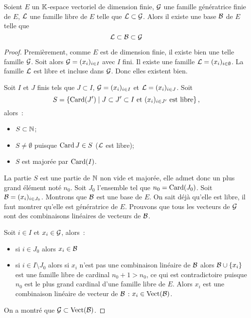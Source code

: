 \begin{theo}
  Soient \(E\) un \(\mathbb{K}\)-espace vectoriel de dimension finie, \(\mathcal{G}\) une famille génératrice finie de \(E\), \(\mathcal{L}\) une famille libre de \(E\) telle que \(\mathcal{L} \subset \mathcal{G}\). Alors il existe une base \(\mathcal{B}\) de \(E\) telle que
  \begin{equation}
    \mathcal{L} \subset \mathcal{B} \subset \mathcal{G}
  \end{equation}
\end{theo}
\begin{proof}
  Premièrement, comme \(E\) est de dimension finie, il existe bien une telle famille \(\mathcal{G}\). Soit alors \(\mathcal{G}=(x_i)_{i \in I}\) avec \(I\) fini. Il existe une famille \(\mathcal{L}=(x_i)_{i \in \emptyset}\). La famille \(\mathcal{L}\) est libre et incluse dans \(\mathcal{G}\). Donc elles existent bien.

  Soit \(I\) et \(J\) finis tels que \(J \subset I\), \(\mathcal{G}=(x_i)_{i \in I}\) et \(\mathcal{L}=(x_i)_{i \in J}\). Soit
  \begin{equation}
    S = \left\{\operatorname{Card}(J')\mathrel{}\middle|\mathrel{}J \subset J' \subset I \text{~et } (x_i)_{i \in J'} \text{~est libre}\right\},
  \end{equation}
  alors~:
  \begin{itemize}
  \item \(S \subset \mathbb{N}\);
  \item \(S \neq \emptyset\) puisque \(\operatorname{Card} J \in S\) (\(\mathcal{L}\) est libre);
  \item \(S\) est majorée par \(\operatorname{Card}(I)\).
  \end{itemize}
  La partie \(S\) est une partie de \(\mathbb{N}\) non vide et majorée, elle admet donc un plus grand élément noté \(n_0\). Soit \(J_0\) l'ensemble tel que \(n_0=\operatorname{Card}(J_0)\). Soit \(\mathcal{B}=(x_i)_{i \in J_0}\). Montrons que \(\mathcal{B}\) est une base de \(E\). On sait déjà qu'elle est libre, il faut montrer qu'elle est génératrice de \(E\). Prouvons que tous les vecteurs de \(\mathcal{G}\) sont des combinaisons linéaires de vecteurs de \(\mathcal{B}\). 

  Soit \(i \in I\) et \(x_i \in \mathcal{G}\), alors~:
  \begin{itemize}
  \item si \(i \in J_0\) alors \(x_i \in \mathcal{B}\)
  \item si \(i \in I\setminus J_0\) alors si \(x_i\) n'est pas une combinaison linéaire de \(\mathcal{B}\) alors \(\mathcal{B} \cup \{x_i\}\) est une famille libre de cardinal \(n_0+1 >n_0\), ce qui est contradictoire puisque \(n_0\) est le plus grand cardinal d'une famille libre de \(E\). Alors \(x_i\) est une combinaison linéaire de vecteur de \(\mathcal{B}\) : \(x_i \in \operatorname{Vect}(\mathcal{B})\).
  \end{itemize}
  On a montré que \(\mathcal{G} \subset \operatorname{Vect}(\mathcal{B})\).


\end{proof}
